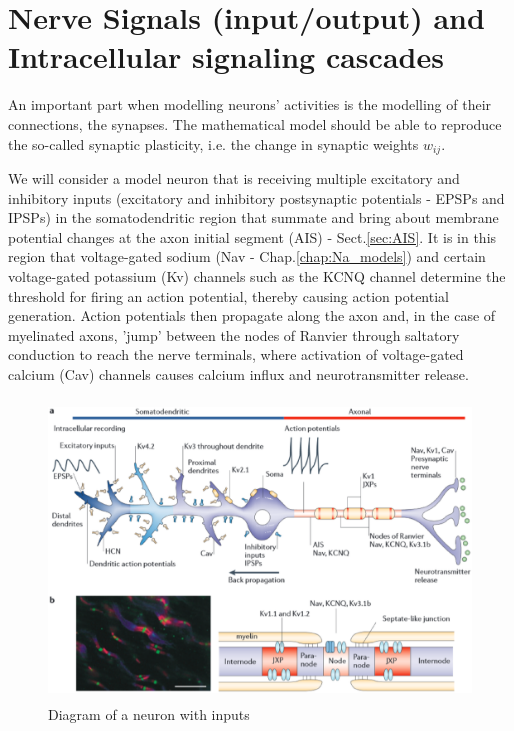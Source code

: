 \chapter{Nerve Signals (input/output) and Intracellular signaling cascades}
\label{chap:nerve-signals}

An important part when modelling neurons' activities is the modelling of their
connections, the synapses. The mathematical model should be able to reproduce
the so-called synaptic plasticity, i.e. the change in synaptic weights $w_{ij}$.

We will consider a model neuron that is receiving multiple excitatory and
inhibitory inputs (excitatory and inhibitory postsynaptic potentials - EPSPs and
IPSPs) in the somatodendritic region that summate and bring about membrane
potential changes at the axon initial segment (AIS) - Sect.\ref{sec:AIS}.
It is in this region that voltage-gated sodium (Nav - Chap.\ref{chap:Na_models})
and certain voltage-gated potassium (Kv) channels such as the KCNQ channel
determine the threshold for firing an action potential, thereby causing action
potential generation.
Action potentials then propagate along the axon and, in the case of myelinated
axons, 'jump' between the nodes of Ranvier through saltatory conduction
to reach the nerve terminals, where activation of voltage-gated calcium (Cav)
channels causes calcium influx and neurotransmitter release.

\begin{figure}[hbt]
  \centerline{\includegraphics[height=8cm,
    angle=0]{./images/neuron-input-output.eps}}
\caption{Diagram of a neuron with inputs}
\label{fig:neuron-input-output}
\end{figure}

